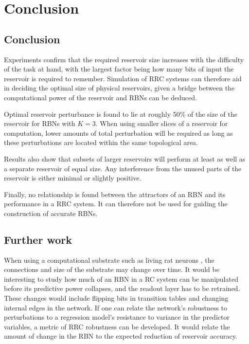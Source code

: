 \chapter{Conclusion}
\label{chapter:conclusion}

\section{Conclusion}

Experiments confirm that the required reservoir size increases with the difficulty of the task at hand,
with the largest factor being how many bits of input the reservoir is required to remember.
Simulation of RRC systems can therefore aid in deciding the optimal size of physical reservoirs,
given a bridge between the computational power of the reservoir and RBNs can be deduced.

Optimal reservoir perturbance is found to lie at roughly 50\% of the size of the reservoir for RBNs with $K=3$.
When using smaller slices of a reservoir for computation,
lower amounts of total perturbation will be required as long as these perturbations are located within the same topological area.

Results also show that subsets of larger reservoirs will perform at least as well as a separate reservoir of equal size.
Any interference from the unused parts of the reservoir is either minimal or slightly positive.

Finally, no relationship is found between the attractors of an RBN and its performance in a RRC system.
It can therefore not be used for guiding the construction of accurate RBNs.

\section{Further work}

When using a computational substrate such as living rat neurons \cite{demarse2005adaptive},
the connections and size of the substrate may change over time.
It would be interesting to study how much of an RBN in a RC system can be manipulated before its predictive power collapses,
and the readout layer has to be retrained.
These changes would include flipping bits in transition tables and changing internal edges in the network.
If one can relate the network's robustness to perturbations to a regression model's resistance to variance in the predictor variables,
a metric of RRC robustness can be developed.
It would relate the amount of change in the RBN to the expected reduction of reservoir accuracy.

